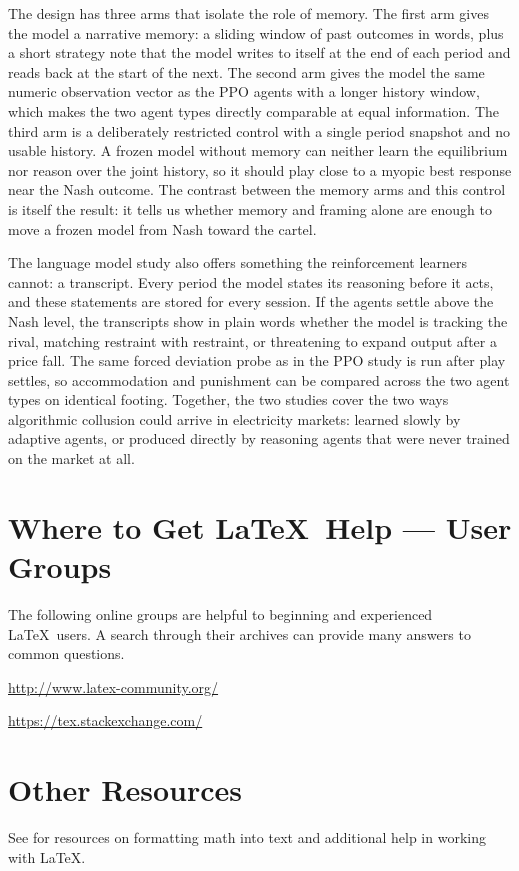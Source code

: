 \documentclass[lettersize,journal]{IEEEtran}
\begin{document}
The design has three arms that isolate the role of memory. The first arm gives the model a narrative memory: a sliding window of past outcomes in words, plus a short strategy note that the model writes to itself at the end of each period and reads back at the start of the next. The second arm gives the model the same numeric observation vector as the PPO agents with a longer history window, which makes the two agent types directly comparable at equal information. The third arm is a deliberately restricted control with a single period snapshot and no usable history. A frozen model without memory can neither learn the equilibrium nor reason over the joint history, so it should play close to a myopic best response near the Nash outcome. The contrast between the memory arms and this control is itself the result: it tells us whether memory and framing alone are enough to move a frozen model from Nash toward the cartel.

The language model study also offers something the reinforcement learners cannot: a transcript. Every period the model states its reasoning before it acts, and these statements are stored for every session. If the agents settle above the Nash level, the transcripts show in plain words whether the model is tracking the rival, matching restraint with restraint, or threatening to expand output after a price fall. The same forced deviation probe as in the PPO study is run after play settles, so accommodation and punishment can be compared across the two agent types on identical footing. Together, the two studies cover the two ways algorithmic collusion could arrive in electricity markets: learned slowly by adaptive agents, or produced directly by reasoning agents that were never trained on the market at all.

\section{Where to Get \LaTeX \ Help --- User Groups}
The following online groups are helpful to beginning and experienced \LaTeX\ users. A search through their archives can provide many answers to common questions.
\begin{list}{}{}
\item{\url{http://www.latex-community.org/}}
\item{\url{https://tex.stackexchange.com/} }
\end{list}

\section{Other Resources}
See \cite{ref1,ref2,ref3,ref4,ref5} for resources on formatting math into text and additional help in working with \LaTeX .
\end{document}
